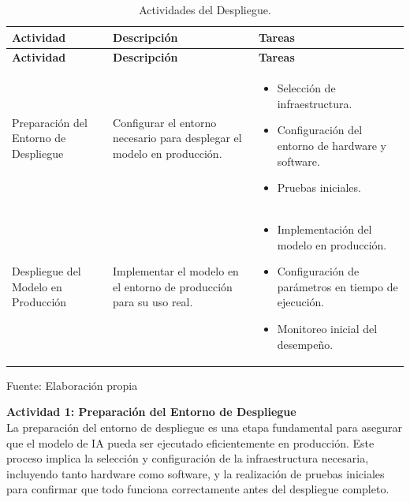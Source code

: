 \begin{longtable}{|>{\raggedright\arraybackslash}p{4cm}|>{\raggedright\arraybackslash}p{5cm}|>{\raggedright\arraybackslash}p{6cm}|}
    \caption{Actividades del Despliegue.}
    \label{tabla:actividades}\\
    \hline
    \textbf{Actividad} & \textbf{Descripción} & \textbf{Tareas} \\
    \hline
    \endfirsthead

    \hline
    \textbf{Actividad} & \textbf{Descripción} & \textbf{Tareas} \\
    \hline
    \endhead

    \hline
    \endfoot

    \hline
    \endlastfoot

    Preparación del Entorno de Despliegue & Configurar el entorno necesario para desplegar el modelo en producción. & 
    \begin{itemize}
        \item Selección de infraestructura.
        \item Configuración del entorno de hardware y software.
        \item Pruebas iniciales.
    \end{itemize} \\
    \hline
    Despliegue del Modelo en Producción & Implementar el modelo en el entorno de producción para su uso real. & 
    \begin{itemize}
        \item Implementación del modelo en producción.
        \item Configuración de parámetros en tiempo de ejecución.
        \item Monitoreo inicial del desempeño.
    \end{itemize} \\
    \hline
\end{longtable}
\begin{flushleft}	%
	\small Fuente: Elaboración propia
\end{flushleft}

\textbf{Actividad 1: Preparación del Entorno de Despliegue}
\\
La preparación del entorno de despliegue es una etapa fundamental para asegurar que el modelo de IA pueda ser ejecutado eficientemente en producción. Este proceso implica la selección y configuración de la infraestructura necesaria, incluyendo tanto hardware como software, y la realización de pruebas iniciales para confirmar que todo funciona correctamente antes del despliegue completo.

